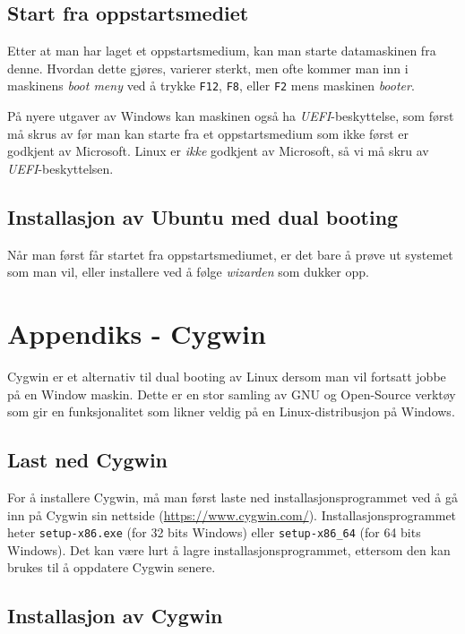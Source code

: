 \subsection{Start fra oppstartsmediet}

Etter at man har laget et oppstartsmedium, kan man starte datamaskinen fra denne. Hvordan dette gjøres, varierer sterkt, men ofte kommer man inn i maskinens \textit{boot meny} ved å trykke \verb|F12|, \verb|F8|, eller \verb|F2| mens maskinen \textit{booter}.

På nyere utgaver av Windows kan maskinen også ha \textit{UEFI}-beskyttelse, som først må skrus av før man kan starte fra et oppstartsmedium som ikke først er godkjent av Microsoft. Linux er \textit{ikke} godkjent av Microsoft, så vi må skru av \textit{UEFI}-beskyttelsen.

\subsection{Installasjon av Ubuntu med dual booting}

Når man først får startet fra oppstartsmediumet, er det bare å prøve ut systemet som man vil, eller installere ved å følge \textit{wizarden} som dukker opp.

\section{Appendiks - Cygwin}\label{app:cygwin}

Cygwin er et alternativ til dual booting av Linux dersom man vil fortsatt jobbe på en Window maskin. Dette er en stor samling av GNU og Open-Source verktøy som gir en funksjonalitet som likner veldig på en Linux-distribusjon på Windows. 

\subsection{Last ned Cygwin}
For å installere Cygwin, må man først laste ned installasjonsprogrammet ved å gå inn på Cygwin sin nettside (\href{https://www.cygwin.com/}{https://www.cygwin.com/}). Installasjonsprogrammet heter \verb|setup-x86.exe| (for 32 bits Windows) eller \verb|setup-x86_64| (for 64 bits Windows). Det kan være lurt å lagre installasjonsprogrammet, ettersom den kan brukes til å oppdatere Cygwin senere.

\subsection{Installasjon av Cygwin}

